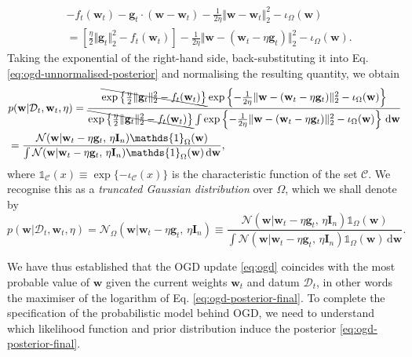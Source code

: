 \begin{align}
\label{eq:ogd-criterion-square-completion}
	& -f_t(\mathbf{w}_t) - \mathbf{g}_t \cdot (\mathbf{w} - \mathbf{w}_t) - \frac{1}{2\eta}\Vert\mathbf{w} - \mathbf{w}_t\Vert_2^2 - \iota_{\Omega}(\mathbf{w})
	\nonumber \\	
	&= \left[\frac{\eta}{2}\Vert\mathbf{g}_t\Vert_2^2 - f_t(\mathbf{w}_t)\right]
	- \frac{1}{2\eta}\Vert\mathbf{w} - (\mathbf{w}_t - \eta\mathbf{g}_t)\Vert_2^2 - \iota_{\Omega}(\mathbf{w}).
\end{align}
Taking the exponential of the right-hand side, back-substituting it into Eq. \eqref{eq:ogd-unnormalised-posterior} and normalising the resulting quantity, we obtain
\begin{align}
\label{eq:ogd-posterior}
	& p(\mathbf{w}|\mathcal{D}_t, \mathbf{w}_t, \eta)
	= \frac{\bcancel{\exp\left\{\frac{\eta}{2}\Vert\mathbf{g}_t\Vert_2^2 - f_t(\mathbf{w}_t)\right\}}\exp\left\{-\frac{1}{2\eta}\Vert\mathbf{w} - (\mathbf{w}_t - \eta\mathbf{g}_t)\Vert_2^2 - \iota_{\Omega}(\mathbf{w})\right\}}
	{\bcancel{\exp\left\{\frac{\eta}{2}\Vert\mathbf{g}_t\Vert_2^2 - f_t(\mathbf{w}_t)\right\}}\int\exp\left\{-\frac{1}{2\eta}\Vert\mathbf{w} - (\mathbf{w}_t - \eta\mathbf{g}_t)\Vert_2^2 - \iota_{\Omega}(\mathbf{w})\right\} \, \mathrm{d}\mathbf{w}}
	\nonumber \\
	&= \frac{\mathcal{N}(\mathbf{w}|\mathbf{w}_t - \eta\mathbf{g}_t,\, \eta\mathbf{I}_n)\mathds{1}_{\Omega}(\mathbf{w})}{\int\mathcal{N}(\mathbf{w}|\mathbf{w}_t - \eta\mathbf{g}_t,\, \eta\mathbf{I}_n)\mathds{1}_{\Omega}(\mathbf{w}) \, \mathrm{d}\mathbf{w}},
\end{align}
where $\mathds{1}_{\mathcal{C}}(x) \equiv \exp\{-\iota_{\mathcal{C}}(x)\}$ is the characteristic function of the set $\mathcal{C}$.
We recognise this as a \emph{truncated Gaussian distribution} over $\Omega$, which we shall denote by
\begin{equation}
\label{eq:ogd-posterior-final}
	p(\mathbf{w}|\mathcal{D}_t, \mathbf{w}_t, \eta)
	= \mathcal{N}_{\Omega}(\mathbf{w}|\mathbf{w}_t - \eta\mathbf{g}_t,\, \eta\mathbf{I}_n)
	\equiv \frac{\mathcal{N}(\mathbf{w}|\mathbf{w}_t - \eta\mathbf{g}_t,\, \eta\mathbf{I}_n)\mathds{1}_{\Omega}(\mathbf{w})}{\int\mathcal{N}(\mathbf{w}|\mathbf{w}_t - \eta\mathbf{g}_t,\, \eta\mathbf{I}_n)\mathds{1}_{\Omega}(\mathbf{w}) \, \mathrm{d}\mathbf{w}}.
\end{equation}

We have thus established that the OGD update \eqref{eq:ogd} coincides with the most probable value of $\mathbf{w}$ given the current weights $\mathbf{w}_t$ and datum $\mathcal{D}_t$, in other words the maximiser of the logarithm of Eq. \eqref{eq:ogd-posterior-final}. To complete the specification of the probabilistic model behind OGD, we need to understand which likelihood function and prior distribution induce the posterior \eqref{eq:ogd-posterior-final}.

